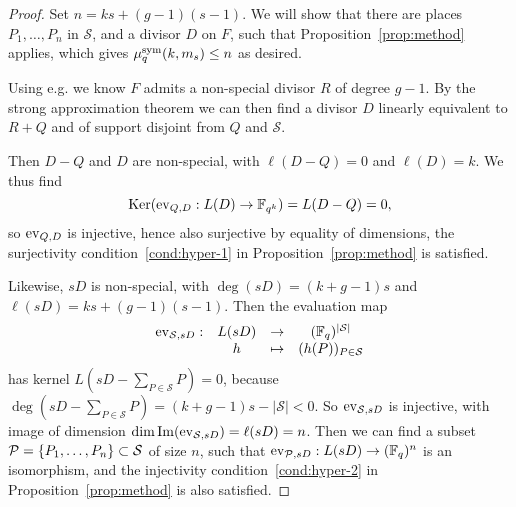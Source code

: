 \begin{proof}
Set $n=ks+(g-1)(s-1)$. We will show that there are places $P_1,\dots,P_n$ in $\mathcal{S}$,
and a divisor $D$ on $F$, such that Proposition~\ref{prop:method} applies,
which gives $\mu^{\textrm{sym}}_q(k,m_s)\leq n$ as desired.

Using e.g. \cite[Lemma~2.1]{Ballet99} we know $F$ admits a non-special divisor $R$ of degree $g-1$.
By the strong approximation theorem \cite[Thm.~1.6.5]{Stichtenoth09}
we can then find a divisor $D$ linearly equivalent to $R+Q$ and of support disjoint from $Q$ and $\mathcal{S}$.

Then $D-Q$ and $D$ are non-special, with $\ell(D-Q)=0$ and $\ell(D)=k$.
We thus find
\[
  \operatorname{Ker}(\operatorname{ev}_{Q, D}:L(D)\to\mathbb{F}_{q^k}) = L(D-Q) = 0,
\]
so $\operatorname{ev}_{Q, D}$ is injective, hence also surjective by equality of dimensions,
\ie the surjectivity condition~\ref{cond:hyper-1} in Proposition~\ref{prop:method} is satisfied.

Likewise, $sD$ is non-special, with $\deg(sD)=(k+g-1)s$ and $\ell(sD)=ks+(g-1)(s-1)$.
Then the evaluation map
\[
\begin{array}{cccc}
\operatorname{ev}_{\mathcal{S}, sD}: & L(sD) & \to & (\mathbb{F}_{q})^{|\mathcal{S}|}\\
  & h & \mapsto & (h(P))_{P\in\mathcal{S}}
\end{array}
\]
has kernel $L(sD-\sum_{P\in\mathcal{S}}P)=0$, because $\deg(sD-\sum_{P\in\mathcal{S}}P)=(k+g-1)s-|\mathcal{S}|<0$.
So $\operatorname{ev}_{\mathcal{S}, sD}$ is injective, with image of dimension $\dim\operatorname{Im}(\operatorname{ev}_{\mathcal{S}, sD})=\ell(sD)=n$.
Then we can find a subset $\mathcal{P}=\{P_1,\dots,P_n\}\subset\mathcal{S}$ of size $n$,
such that $\operatorname{ev}_{\mathcal{P}, sD}: L(sD) \to (\mathbb{F}_{q})^n$ is an isomorphism,
and the injectivity condition~\ref{cond:hyper-2} in Proposition~\ref{prop:method} is also satisfied.
\end{proof}


